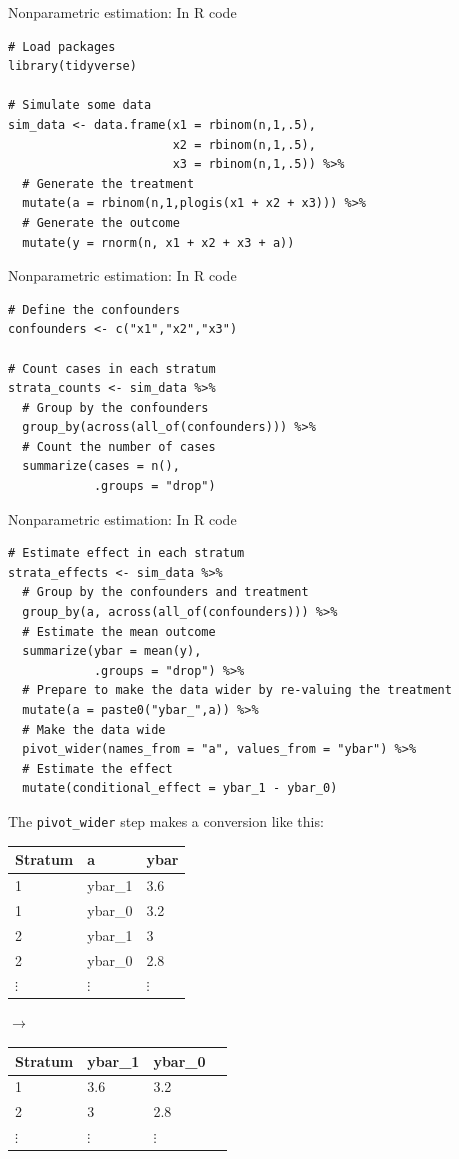 \documentclass{beamer}
\begin{document}
\begin{frame}[fragile]{Nonparametric estimation: In R code}
\footnotesize \pause
\begin{verbatim}
# Load packages
library(tidyverse)

# Simulate some data
sim_data <- data.frame(x1 = rbinom(n,1,.5),
                       x2 = rbinom(n,1,.5),
                       x3 = rbinom(n,1,.5)) %>%
  # Generate the treatment
  mutate(a = rbinom(n,1,plogis(x1 + x2 + x3))) %>%
  # Generate the outcome
  mutate(y = rnorm(n, x1 + x2 + x3 + a))
\end{verbatim}
\end{frame}

\begin{frame}[fragile]{Nonparametric estimation: In R code}
\footnotesize
\begin{verbatim}
# Define the confounders
confounders <- c("x1","x2","x3")

# Count cases in each stratum
strata_counts <- sim_data %>%
  # Group by the confounders
  group_by(across(all_of(confounders))) %>%
  # Count the number of cases
  summarize(cases = n(),
            .groups = "drop")
\end{verbatim}
\end{frame}

\begin{frame}[fragile]{Nonparametric estimation: In R code}
\footnotesize
\begin{verbatim}
# Estimate effect in each stratum
strata_effects <- sim_data %>%
  # Group by the confounders and treatment
  group_by(a, across(all_of(confounders))) %>%
  # Estimate the mean outcome
  summarize(ybar = mean(y),
            .groups = "drop") %>%
  # Prepare to make the data wider by re-valuing the treatment
  mutate(a = paste0("ybar_",a)) %>%
  # Make the data wide
  pivot_wider(names_from = "a", values_from = "ybar") %>%
  # Estimate the effect
  mutate(conditional_effect = ybar_1 - ybar_0)
\end{verbatim}
The \texttt{pivot\_wider} step makes a conversion like this:
\begin{tabular}{lll}
Stratum & a & ybar \\
\hline
1 & ybar\_1 & 3.6 \\
1 & ybar\_0 & 3.2 \\
2 & ybar\_1 & 3 \\
2 & ybar\_0 & 2.8 \\
$\vdots$ & $\vdots$ & $\vdots$
\end{tabular}\quad $\rightarrow$ \quad \begin{tabular}{llll}
Stratum & ybar\_1 & ybar\_0 \\
\hline
1 & 3.6 & 3.2 \\
2 & 3 & 2.8\\
$\vdots$ & $\vdots$ & $\vdots$
\end{tabular}
\end{frame}
\end{document}
